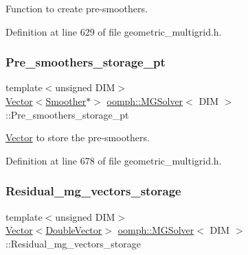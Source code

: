 Function to create pre-\/smoothers. 



Definition at line 629 of file geometric\+\_\+multigrid.\+h.

\mbox{\label{classoomph_1_1MGSolver_a50cea09c4fd325e52c6d50884095bac8}} 
\subsubsection{\texorpdfstring{Pre\+\_\+smoothers\+\_\+storage\+\_\+pt}{Pre\_smoothers\_storage\_pt}}
{\footnotesize\ttfamily template$<$unsigned D\+IM$>$ \\
\hyperlink{classoomph_1_1Vector}{Vector}$<$\hyperlink{classoomph_1_1Smoother}{Smoother}$\ast$$>$ \hyperlink{classoomph_1_1MGSolver}{oomph\+::\+M\+G\+Solver}$<$ D\+IM $>$\+::Pre\+\_\+smoothers\+\_\+storage\+\_\+pt\hspace{0.3cm}{\ttfamily [private]}}



\hyperlink{classoomph_1_1Vector}{Vector} to store the pre-\/smoothers. 



Definition at line 678 of file geometric\+\_\+multigrid.\+h.

\mbox{\label{classoomph_1_1MGSolver_a2c3f9d64997faf275de633fe3c799fee}} 
\subsubsection{\texorpdfstring{Residual\+\_\+mg\+\_\+vectors\+\_\+storage}{Residual\_mg\_vectors\_storage}}
{\footnotesize\ttfamily template$<$unsigned D\+IM$>$ \\
\hyperlink{classoomph_1_1Vector}{Vector}$<$\hyperlink{classoomph_1_1DoubleVector}{Double\+Vector}$>$ \hyperlink{classoomph_1_1MGSolver}{oomph\+::\+M\+G\+Solver}$<$ D\+IM $>$\+::Residual\+\_\+mg\+\_\+vectors\+\_\+storage\hspace{0.3cm}{\ttfamily [private]}}



